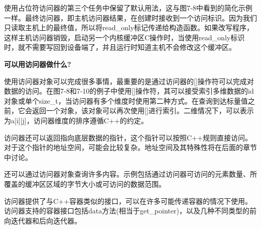 使用占位符访问器的第三个任务中保留了默认用法，这与图7-8中看到的简化示例一样。最终访问器，即主机访问器结果，在创建时接收到一个访问标识。因为我们只读取主机上的最终值，所以将read\_only标记传递给构造函数。如果改写程序，这样主机访问器销毁，启动另一个内核缓冲区C操作时，当使用read\_only标识时，就不需要写回到设备端了，并且运行时知道主机不会修改这个缓冲区。\par

\hspace*{\fill} \par %
\textbf{可以用访问器做什么?}

使用访问器对象可以完成很多事情，最重要的是通过访问器的[]操作符可以完成对数据的访问。在图7-8和7-10的例子中使用[]操作符，其可以接受索引多维数据的id对象或单个size\_t，当访问器有多个维度时使用第二种方式。在查询到达标量值之前，它会返回一个对象，该对象可以再次使用[]进行索引。二维情况下，可以表示为a[i][j]，访问器维度的排序遵循C++的约定。\par

访问器还可以返回指向底层数据的指针，这个指针可以按照C++规则直接访问。对于这个指针的地址空间，可能会比较复杂。地址空间及其特殊性将在后面的章节中讨论。\par

还可以通过访问器对象查询许多内容。示例包括通过访问器可访问的元素数量、所覆盖的缓冲区区域的字节大小或可访问的数据范围。\par

访问器提供了与C++容器类似的接口，可以在许多可能传递容器的情况下使用。访问器支持的容器接口包括data方法(相当于get\_pointer)，以及几种不同类型的前向迭代器和后向迭代器。\par










































